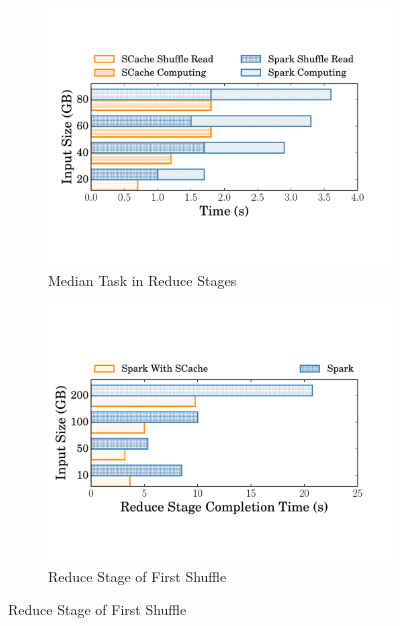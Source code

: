 \begin{figure}
\begin{minipage}[t]{.32\linewidth}
\begin{subfigure}{\linewidth}
			\begin{minipage}{\linewidth}
				\includegraphics[width=\linewidth]{fig/groupbyreducetask}
				\caption{Median Task in Reduce Stages\newline}
				\label{fig:reducetask}
			\end{minipage}
		\end{subfigure}
		\vspace{-1em}
		\caption{Median Task Completion\newline Time of Single Shuffle Test}
		\label{fig:singleshuffletask}
	\end{minipage}	
	\begin{minipage}[t]{.32\linewidth}
		\begin{subfigure}{\linewidth}
			\vspace{-0.5em}
			\begin{minipage}{\linewidth}
				\includegraphics[width=\linewidth]{fig/tera}
				\caption{Reduce Stage of First Shuffle}
				\label{fig:terasort}
			\end{minipage}


\end{subfigure}
\end{minipage}
\end{figure}
